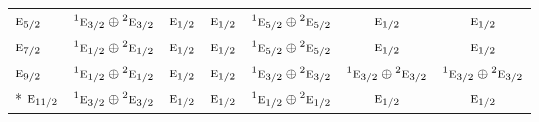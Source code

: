 \documentclass[10pt,a4paper]{article}
\numberwithin{equation}{section}
\newcommand{\irr}[1]{\text{\normalfont\scshape #1}}
\newcommand{\conjpair}[1]{{}^{#1}}
\begin{document}
{\begin{longtable}{@{}lcccccc@{}}
$\irr{e}_{5/2}$ & $\conjpair{1}\irr{e}_{3/2}\oplus \conjpair{2}\irr{e}_{3/2}$ & $\irr{e}_{1/2}$ & $\irr{e}_{1/2}$ & $\conjpair{1}\irr{e}_{5/2}\oplus \conjpair{2}\irr{e}_{5/2}$ & $\irr{e}_{1/2}$ & $\irr{e}_{1/2}$\\
$\irr{e}_{7/2}$ & $\conjpair{1}\irr{e}_{1/2}\oplus \conjpair{2}\irr{e}_{1/2}$ & $\irr{e}_{1/2}$ & $\irr{e}_{1/2}$ & $\conjpair{1}\irr{e}_{5/2}\oplus \conjpair{2}\irr{e}_{5/2}$ & $\irr{e}_{1/2}$ & $\irr{e}_{1/2}$\\
$\irr{e}_{9/2}$ & $\conjpair{1}\irr{e}_{1/2}\oplus \conjpair{2}\irr{e}_{1/2}$ & $\irr{e}_{1/2}$ & $\irr{e}_{1/2}$ & $\conjpair{1}\irr{e}_{3/2}\oplus \conjpair{2}\irr{e}_{3/2}$ & $\conjpair{1}\irr{e}_{3/2}\oplus \conjpair{2}\irr{e}_{3/2}$ & $\conjpair{1}\irr{e}_{3/2}\oplus \conjpair{2}\irr{e}_{3/2}$\\*
$\irr{e}_{11/2}$ & $\conjpair{1}\irr{e}_{3/2}\oplus \conjpair{2}\irr{e}_{3/2}$ & $\irr{e}_{1/2}$ & $\irr{e}_{1/2}$ & $\conjpair{1}\irr{e}_{1/2}\oplus \conjpair{2}\irr{e}_{1/2}$ & $\irr{e}_{1/2}$ & $\irr{e}_{1/2}$\\
\bottomrule\end{longtable}}
\end{document}

